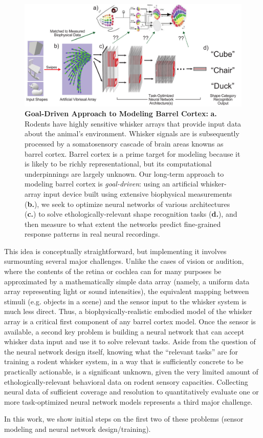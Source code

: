 \begin{figure}
\centering
\includegraphics [width=1\linewidth]{figures/schematic.pdf}
\vspace{-2mm}
\caption{\textbf{Goal-Driven Approach to Modeling Barrel Cortex:} \textbf{a.} Rodents have highly sensitive whisker arrays that provide input data about the animal's environment.  Whisker signals are is subsequently processed by a somatosensory cascade of brain areas knowns as barrel cortex. Barrel cortex is a prime target for modeling because it is likely to be richly representational, but its computational underpinnings are largely unknown. Our long-term approach to modeling barrel cortex is \emph{goal-driven}: using an artificial whisker-array input device built using extensive biophysical measurements (\textbf{b.}), we seek to optimize neural networks of various architectures (\textbf{c.}) to solve ethologically-relevant shape recognition tasks (\textbf{d.}), and then measure to what extent the networks predict fine-grained response patterns in real neural recordings. ~\label{fig_schematic}}
\end{figure}

This idea is conceptually straightforward, but implementing it involves surmounting several major challenges.
Unlike the cases of vision or audition, where the contents of the retina or cochlea can for many purposes be approximated by a mathematically simple data array (namely, a uniform data array representing light or sound intensities), the equivalent mapping between stimuli (e.g. objects in a scene) and the sensor input to the whisker system is much less direct.
Thus, a biophysically-realistic embodied model of the whisker array is a critical first component of any barrel cortex model.
Once the sensor is available, a second key problem is building a neural network that can accept whisker data input and use it to solve relevant tasks.
Aside from the question of the neural network design itself, knowing what the ``relevant tasks'' are for training a rodent whisker system, in a way that is sufficiently concrete to be practically actionable, is a significant unknown, given the very limited amount of ethologically-relevant behavioral data on rodent sensory capacities\cite{von2007neuronal, Knutsen2006, OConnor2010, Arabzadeh2005, Diamond2008}.
Collecting neural data of sufficient coverage and resolution to quantitatively evaluate one or more task-optimized neural network models represents a third major challenge.

In this work, we show initial steps on the first two of these problems (sensor modeling and neural network design/training).



